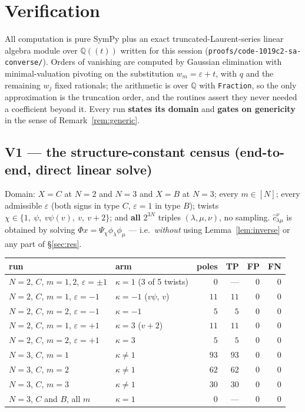 \documentclass[11pt]{article}
\theoremstyle{definition}
\begin{document}
\section{Verification}
\label{sec:verif}

All computation is pure SymPy plus an exact truncated-Laurent-series linear
algebra module over $\mathbb{Q}((t))$ written for this session
(\texttt{proofs/code-1019c2-sa-converse/}).  Orders of vanishing are computed by
Gaussian elimination with minimal-valuation pivoting on the substitution
$w_m=\varepsilon+t$, with $q$ and the remaining $w_j$ fixed rationals; the
arithmetic is over $\mathbb{Q}$ with \texttt{Fraction}, so the only
approximation is the truncation order, and the routines assert they never needed
a coefficient beyond it.  Every run \textbf{states its domain} and \textbf{gates
on genericity} in the sense of Remark~\ref{rem:generic}.

\subsection*{V1 --- the structure-constant census (end-to-end, direct linear solve)}
Domain: $X=C$ at $N=2$ and $N=3$ and $X=B$ at $N=3$; every $m\in[N]$; every
admissible $\varepsilon$ (both signs in type $C$, $\varepsilon=1$ in type $B$);
twists $\chi\in\{1,\ \psi,\ v\psi(v),\ v,\ v+2\}$; and \textbf{all} $2^{3N}$
triples $(\lambda,\mu,\nu)$, no sampling.  $\hat c^{\nu}_{\lambda\mu}$ is obtained
by solving $\Phi x=\Psi_\chi\phi_\lambda\phi_\mu$ --- i.e.\ \emph{without} using
Lemma~\ref{lem:inverse} or any part of \S\ref{sec:res}.

\begin{center}
\begin{tabular}{llrrrr}
\toprule
run & arm & poles & TP & FP & FN\\
\midrule
$N=2$, $C$, $m=1,2$, $\varepsilon=\pm1$ & $\kappa=1$ (3 of 5 twists) & $0$ & --- & $0$ & $0$\\
$N=2$, $C$, $m=1$, $\varepsilon=-1$ & $\kappa=-1$ ($v\psi$, $v$) & $11$ & $11$ & $0$ & $0$\\
$N=2$, $C$, $m=2$, $\varepsilon=-1$ & $\kappa=-1$ & $5$ & $5$ & $0$ & $0$\\
$N=2$, $C$, $m=1$, $\varepsilon=+1$ & $\kappa=3$ ($v+2$) & $11$ & $11$ & $0$ & $0$\\
$N=2$, $C$, $m=2$, $\varepsilon=+1$ & $\kappa=3$ & $5$ & $5$ & $0$ & $0$\\
$N=3$, $C$, $m=1$ & $\kappa\ne1$ & $93$ & $93$ & $0$ & $0$\\
$N=3$, $C$, $m=2$ & $\kappa\ne1$ & $62$ & $62$ & $0$ & $0$\\
$N=3$, $C$, $m=3$ & $\kappa\ne1$ & $30$ & $30$ & $0$ & $0$\\
$N=3$, $C$ and $B$, all $m$ & $\kappa=1$ & $0$ & --- & $0$ & $0$\\
\bottomrule
\end{tabular}
\end{center}
\end{document}
